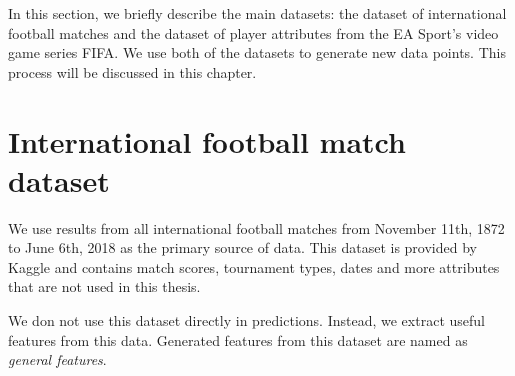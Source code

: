 In this section, we briefly describe the main datasets: the dataset of international football matches and the dataset of player attributes from the EA Sport's video game series FIFA. We use both of the datasets to generate new data points. This process will be discussed in this chapter.

\section{International football match dataset}
We use results from all international football matches from November 11th, 1872 to June 6th, 2018 as the primary source of data. This dataset is provided by Kaggle \cite{matchdb} and contains match scores, tournament types, dates and more attributes that are not used in this thesis.

We don not use this dataset directly in predictions. Instead, we extract useful features from this data. Generated features from this dataset are named as \textit{general features}.
\renewcommand{\labelitemi}{}
